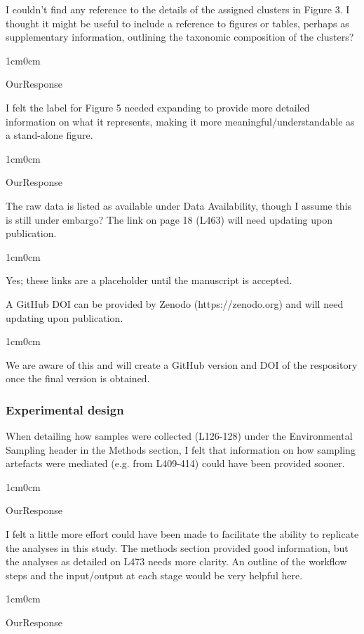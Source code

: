 \documentclass{article}
\newenvironment{response}
	{
	\begin{adjustwidth}{1cm}{0cm}
	\itshape %
	}
	{
	\end{adjustwidth}
	}
\begin{document}
I couldn’t find any reference to the details of the assigned clusters in Figure 3. I thought it might be useful to include a reference to figures or tables, perhaps as supplementary information, outlining the taxonomic composition of the clusters?
\begin{response}
  OurResponse\\
\end{response}

I felt the label for Figure 5 needed expanding to provide more detailed information on what it represents, making it more meaningful/understandable as a stand-alone figure.
\begin{response}
  OurResponse\\
\end{response}

The raw data is listed as available under Data Availability, though I assume this is still under embargo? The link on page 18 (L463) will need updating upon publication.
\begin{response}
  Yes; these links are a placeholder until the manuscript is accepted.\\
\end{response}

A GitHub DOI can be provided by Zenodo (https://zenodo.org) and will need updating upon publication.
\begin{response}
  We are aware of this and will create a GitHub version and DOI of the respository once the final version is obtained.\\
\end{response}

\subsubsection*{Experimental design}
When detailing how samples were collected (L126-128) under the Environmental Sampling header in the Methods section, I felt that information on how sampling artefacts were mediated (e.g. from L409-414) could have been provided sooner.
\begin{response}
  OurResponse\\
\end{response}

I felt a little more effort could have been made to facilitate the ability to replicate the analyses in this study. The methods section provided good information, but the analyses as detailed on L473 needs more clarity. An outline of the workflow steps and the input/output at each stage would be very helpful here.
\begin{response}
  OurResponse\\
\end{response}
\end{document}
